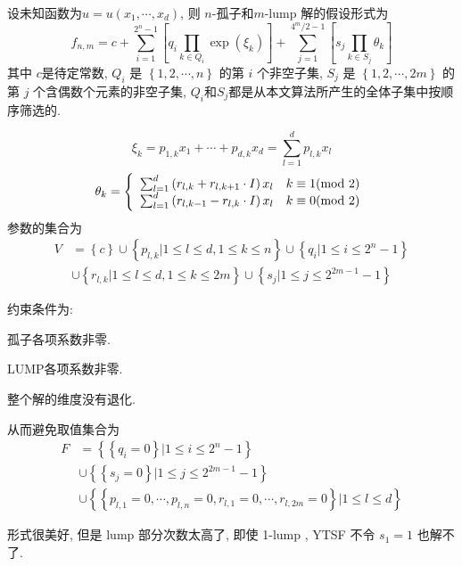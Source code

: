 \documentclass{article}
\newcommand{\sbrace}[1]{\left(#1\right)}
\newcommand{\mbrace}[1]{\left[#1\right]}
\newcommand{\bbrace}[1]{\left\{#1\right\}}
\begin{document}
设未知函数为$u=u(x_1,\cdots,x_d)$, 则 $n$-孤子和$m$-lump 解的假设形式为
\begin{equation}
    f_{n,m}=c+\sum_{i=1}^{2^n-1}\mbrace{q_i\prod_{k\in Q_i}{\exp(\xi_k)}}+\sum_{j=1}^{4^m/2-1}\mbrace{s_j\prod_{k \in S_j}{\theta_k}}
\end{equation}
其中 $c$是待定常数, $Q_i$ 是 $\bbrace{1,2,\cdots,n}$ 的第 $i$ 个非空子集, $S_j$ 是 $\bbrace{1,2,\cdots,2m}$ 的第 $j$ 个含偶数个元素的非空子集, $Q_i$和$S_j$都是从本文算法所产生的全体子集中按顺序筛选的. 

\begin{equation}
    \xi_k=p_{1,k}x_1+\cdots+p_{d,k}x_d=\sum_{l=1}^d{p_{l,k}x_l}
\end{equation}
\begin{equation}
    \theta_k=\left\{\begin{array}{ll}
        \sum_{l=1}^d{\sbrace{r_{l,k}+r_{l,k+1}\cdot I}x_l} & k \equiv 1 ({\rm mod~} 2)   \\ 
        \sum_{l=1}^d{\sbrace{r_{l,k-1}-r_{l,k}\cdot I}x_l} & k \equiv 0 ({\rm mod~} 2) \\ 
    \end{array}\right.
\end{equation}
参数的集合为
\begin{equation}
\begin{split}
V&=\bbrace{c}\cup\bbrace{p_{l,k}|1\le l\le d, 1\le k \le n}\cup \bbrace{q_i|1\le i \le 2^n-1}\\
 &\cup\bbrace{r_{l,k}|1\le l \le d,1\le k \le 2m}\cup\bbrace{s_j|1\le j \le 2^{2m-1}-1}
\end{split}
\end{equation}

约束条件为:
\begin{compactitem}[\textbullet]
\item 孤子各项系数非零.
\item LUMP各项系数非零.
\item 整个解的维度没有退化.
\end{compactitem}

从而避免取值集合为
\begin{equation}
\begin{split}
F&=\bbrace{\bbrace{q_i=0}|1\le i \le 2^n-1} \\
&\cup\bbrace{\bbrace{s_j=0}|1\le j \le 2^{2m-1}-1} \\
&\cup\bbrace{\bbrace{p_{l,1}=0,\cdots,p_{l,n}=0,r_{l,1}=0,\cdots,r_{l,2m}=0}|1\le l \le d}
\end{split}
\end{equation}

形式很美好, 但是 lump 部分次数太高了, 即使 1-lump , YTSF 不令 $s_1=1$ 也解不了. 
\end{document}

